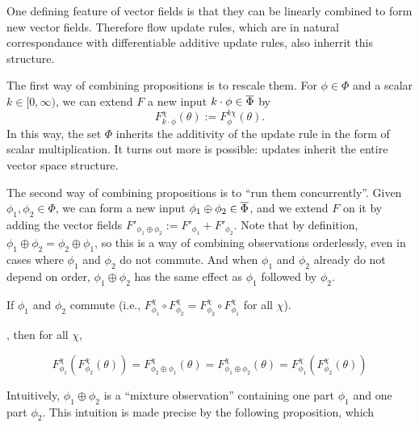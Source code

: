 One defining feature of vector fields is that they
can be linearly combined to form new vector fields.
Therefore flow update rules, which are in natural correspondance with differentiable additive update rules, also inherrit this structure.

The first way of combining propositions is to rescale them.
For $\phi \in \Phi$ and a scalar $k \in [0,\infty)$, 
we can extend $F$ a new input $k \cdot \phi \in \overline \Phi$ by
\[
	F^{\chi}_{k\cdot\phi}(\theta) := F^{k\chi}_{\phi}(\theta).
\]
In this way, the set $\Phi$ inherits 
the additivity of the update rule in the form of scalar multiplication.
It turns out more is possible: updates inherit the entire vector space structure.


The second way of combining propositions is to ``run them concurrently''.
Given $\phi_1, \phi_2 \in \Phi$, we can form a new input 
$\phi_1 \oplus \phi_2 \in \overline \Phi$, and we extend $F$ on it by
adding the vector fields
$F'_{\phi_1 \oplus \phi_2} := F'_{\phi_1} + F'_{\phi_2}$.
Note that by definition, $\phi_1 \oplus \phi_2 = \phi_2 \oplus \phi_1$,
so this is a way of combining observations orderlessly, even in cases
where $\phi_1$ and $\phi_2$ do not commute. And when $\phi_1$ and $\phi_2$
already do not depend on order, $\phi_1\oplus \phi_2$ has the same effect
as $\phi_1$ followed by $\phi_2$.

\begin{prop}
	If $\phi_1$ and $\phi_2$ commute
	(i.e., $F^{\chi}_{\phi_1} \circ F^{\chi}_{\phi_2} =
	 	F^{\chi}_{\phi_2} \circ F^{\chi}_{\phi_1}$ for all $\chi$).
	
	\unskip, then for all $\chi
	 $,
	
	\[
		F^{\chi}_{\phi_1}( F^{\chi}_{\phi_2}(\theta))
		=
		F^{\chi}_{\phi_2 \oplus \phi_1} (\theta)
		=
		F^{\chi}_{\phi_1 \oplus \phi_2} (\theta)
		=
		F^{\chi}_{\phi_1}( F^{\chi}_{\phi_2}(\theta)) 
	\]
\end{prop}

Intuitively, $\phi_1 \oplus \phi_2$ is a ``mixture observation'' containing
one part $\phi_1$ and one part $\phi_2$. This intuition is made
precise by the following proposition, which 

